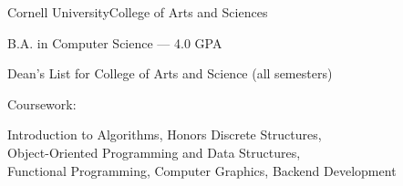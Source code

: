 \documentclass{resume}
\begin{document}
\begin{education}
    \begin{entryleft}{Cornell University}{College of Arts and Sciences}{}
        \begin{description}
            \item B.A. in Computer Science --- 4.0 GPA
            \item Dean's List for College of Arts and Science (all semesters)
            \begin{spacing}{0}
            \item Coursework:
            \end{spacing}
                    \begin{addmargin}[1em]{0em}
                        Introduction to Algorithms,
                        Honors Discrete Structures,\\
                        Object-Oriented Programming and Data Structures,\\
                        Functional Programming,
                        Computer Graphics,
                        Backend Development
                    \end{addmargin}
        \end{description}
    \end{entryleft}
    \begin{entryright}
    \end{entryright}
\end{education}
\end{document}
